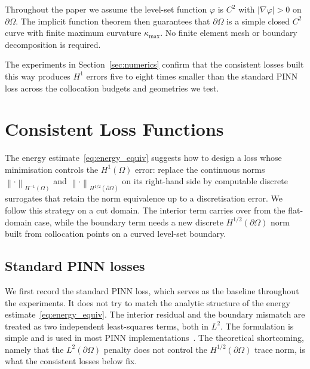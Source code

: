 \documentclass[11pt]{article}
\newcommand{\Omg}{\Omega}
\newcommand{\bOmg}{\partial\Omega}
\newcommand{\Honehalf}{H^{1/2}(\partial\Omega)}
\newcommand{\norm}[1]{\left\|#1\right\|}
\begin{document}
Throughout the paper we assume the level-set function $\varphi$ is
$C^2$ with $|\nabla\varphi| > 0$ on $\partial\Omega$. The implicit
function theorem then guarantees that $\partial\Omega$ is a simple
closed $C^2$ curve with finite maximum curvature $\kappa_{\max}$. No
finite element mesh or boundary decomposition is required.



The experiments in Section~\ref{sec:numerics} confirm that the
consistent losses built this way produces $H^1$ errors five to eight
times smaller than the standard PINN loss across the collocation
budgets and geometries we test.



\section{Consistent Loss Functions}
\label{sec:losses}

The energy estimate~\eqref{eq:energy_equiv} suggests how to design
a loss whose minimisation controls the $H^1(\Omg)$ error: replace
the continuous norms $\norm{\cdot}_{H^{-1}(\Omg)}$ and
$\norm{\cdot}_{\Honehalf}$ on its right-hand side by computable
discrete surrogates that retain the norm equivalence up to a
discretisation error. We follow this strategy on a cut domain.
The interior term carries over from the flat-domain case, while
the boundary term needs a new discrete $\Honehalf$ norm built
from collocation points on a curved level-set boundary.

\subsection{Standard PINN losses}

We first record the standard PINN loss, which serves as the
baseline throughout the experiments. It does not try to match the
analytic structure of the energy estimate~\eqref{eq:energy_equiv}. 
The interior residual and the boundary mismatch are treated as two
independent least-squares terms, both in $L^2$. The formulation is
simple and is used in most PINN
implementations~\cite{raissi2019, cuomo2022}. The theoretical
shortcoming, namely that the $L^2(\bOmg)$ penalty does
not control the $\Honehalf$ trace norm, is what the consistent
losses below fix.
\end{document}
